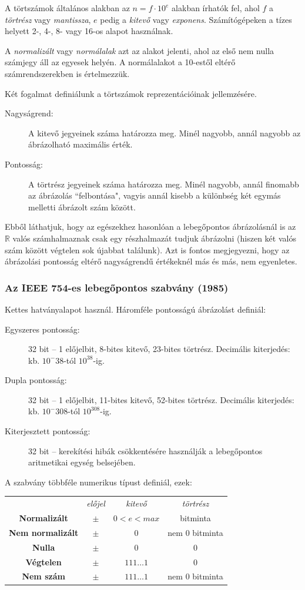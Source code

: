 \documentclass[a4paper]{article}
\begin{document}
A törtszámok általános alakban az $n=f \cdot 10^e$ alakban írhatók fel, ahol $f$ a \emph{törtrész} vagy \emph{mantissza}, $e$ pedig a \emph{kitevő} vagy \emph{exponens}. Számítógépeken a tízes helyett 2-, 4-, 8- vagy 16-os alapot használnak.

A \emph{normalizált} vagy \emph{normálalak} azt az alakot jelenti, ahol az első nem nulla számjegy áll az egyesek helyén. A normálalakot a 10-estől eltérő számrendszerekben is értelmezzük.

Két fogalmat definiálunk a törtszámok reprezentációinak jellemzésére.
\begin{description}
	\item[Nagyságrend:] A kitevő jegyeinek száma határozza meg. Minél nagyobb, annál nagyobb az ábrázolható maximális érték.
	\item[Pontosság:] A törtrész jegyeinek száma határozza meg. Minél nagyobb, annál finomabb az ábrázolás ``felbontása", vagyis annál kisebb a különbség két egymás melletti ábrázolt szám között.
\end{description}
Ebből láthatjuk, hogy az egészekhez hasonlóan a lebegőpontos ábrázolásnál is az $\mathbb{R}$ valós számhalmaznak csak egy részhalmazát tudjuk ábrázolni (hiszen két valós szám között végtelen sok újabbat találunk). Azt is fontos megjegyezni, hogy az ábrázolási pontosság eltérő nagyságrendű értékeknél más és más, nem egyenletes.

\subsubsection{Az IEEE 754-es lebegőpontos szabvány (1985)}

Kettes hatványalapot használ. Háromféle pontosságú ábrázolást definiál:
\begin{description}
	\item[Egyszeres pontosság:] 32 bit -- 1 előjelbit, 8-bites kitevő, 23-bites törtrész. Decimális kiterjedés: kb. $10^-38$-tól $10^38$-ig.
	\item[Dupla pontosság:] 32 bit -- 1 előjelbit, 11-bites kitevő, 52-bites törtrész. Decimális kiterjedés: kb. $10^-308$-tól $10^308$-ig.
	\item[Kiterjesztett pontosság:] 32 bit -- kerekítési hibák csökkentésére használják a lebegőpontos aritmetikai egység belsejében.
\end{description}

A szabvány többféle numerikus típust definiál, ezek:

\vspace{3mm}
\begin{tabular}{c c c c}
	& \emph{előjel} & \emph{kitevő} & \emph{törtrész}\\
	\textbf{Normalizált} & $\pm$ & $0<e<max$ & bitminta\\
	\textbf{Nem normalizált} & $\pm$ & 0 & nem 0 bitminta\\
	\textbf{Nulla} & $\pm$ & 0 & 0\\
	\textbf{Végtelen} & $\pm$ & $111\dots1$ & 0\\
	\textbf{Nem szám} & $\pm$ & $111\dots1$ & nem 0 bitminta\\
\end{tabular}
\vspace{3mm}
\end{document}
